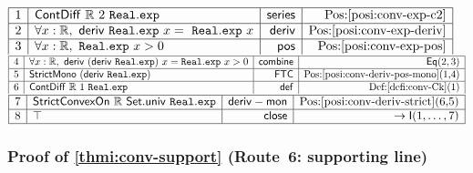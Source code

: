 \documentclass[11pt,reqno]{amsart}
\theoremstyle{redplain}
\numberwithin{equation}{section}
\begin{document}
\begin{center}
$%
\begin{array}{|c|l|r|r|}
\hline
1 & \mathsf{ContDiff}\ \mathbb{R}\ 2\ \mathtt{Real.exp} & \mathsf{series} & %
\mbox{Pos:\ref{posi:conv-exp-c2}} \\ \hline
2 & \forall x:\mathbb{R},\ \mathsf{deriv}\ \mathtt{Real.exp}\ x=\mathtt{\
Real.exp}\ x & \mathsf{deriv} & \mbox{Pos:\ref{posi:conv-exp-deriv}} \\ 
\hline
3 & \forall x:\mathbb{R},\ \mathtt{Real.exp}\ x>0 & \mathsf{pos} & %
\mbox{Pos:\ref{posi:conv-exp-pos}}%
\end{array}%
$ \noindent $%
\begin{array}{|c|l|r|r|}
\hline
4 & \forall x:\mathbb{R},\ \mathsf{deriv}\ (\mathsf{deriv}\ \mathtt{Real.exp}
)\ x=\mathtt{Real.exp}\ x>0 & \mathsf{combine} & \mathsf{Eq}(2,3) \\ \hline
5 & \mathsf{StrictMono}\ (\mathsf{deriv}\ \mathtt{Real.exp}) & \mathsf{FTC}
& \mbox{Pos:\ref{posi:conv-deriv-pos-mono}(1,4)} \\ \hline
6 & \mathsf{ContDiff}\ \mathbb{R}\ 1\ \mathtt{Real.exp} & \mathsf{def} & %
\mbox{Def:\ref{defi:conv-Ck}(1)}%
\end{array}%
$ \noindent $%
\begin{array}{|c|l|r|r|}
\hline
7 & \mathsf{StrictConvexOn}\ \mathbb{R}\ \mathsf{Set.univ}\ \mathtt{Real.exp}
& \mathsf{deriv-mon} & \mbox{Pos:\ref{posi:conv-deriv-strict}(6,5)} \\ \hline
8 & \top & \mathsf{close} & \rightarrow \mathsf{I}(1,\dots ,7) \\ \hline
\end{array}%
$
\end{center}

\subsubsection*{Proof of \autoref{thmi:conv-support} (Route~6: supporting
line)}
\end{document}
